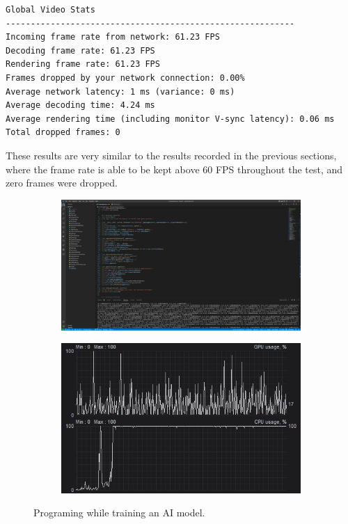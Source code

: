 \vspace{3mm} %
\begin{lstlisting}[style=plaintext,title=Statistics recorded while streaming KiCad (Figure \ref{fig:RealWorldKicad})]
Global Video Stats
----------------------------------------------------------
Incoming frame rate from network: 61.23 FPS
Decoding frame rate: 61.23 FPS
Rendering frame rate: 61.23 FPS
Frames dropped by your network connection: 0.00%
Average network latency: 1 ms (variance: 0 ms)
Average decoding time: 4.24 ms
Average rendering time (including monitor V-sync latency): 0.06 ms
Total dropped frames: 0
\end{lstlisting}

These results are very similar to the results recorded in the previous sections, where the frame rate is able to be kept above 60 FPS throughout the test, and zero frames were dropped.

\begin{figure}[t]
  \centering
  \begin{subfigure}{1\textwidth}
    \centering
    \includegraphics[width=.9\linewidth]{Figures/realworld/ai}
  \end{subfigure}
  \begin{subfigure}{1\textwidth}
    \centering
    \includegraphics[width=.5\linewidth]{Figures/realworld/aistats}
  \end{subfigure}
  \caption[Streaming the training of an AI]{Programing while training an AI model.}
  \label{fig:RealWorldAI}
\end{figure}

